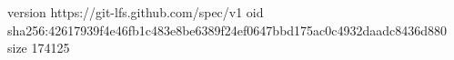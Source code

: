 version https://git-lfs.github.com/spec/v1
oid sha256:42617939f4e46fb1c483e8be6389f24ef0647bbd175ac0c4932daadc8436d880
size 174125
